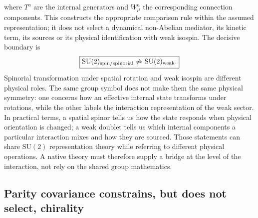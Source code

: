 \documentclass[11pt]{article}
\theoremstyle{definition}
\newcommand{\SUtwo}{\mathrm{SU}(2)}
\begin{document}
where $T^a$ are the internal generators and $W_\mu^a$ the corresponding connection components.  This constructs the appropriate comparison rule within the assumed representation; it does not select a dynamical non-Abelian mediator, its kinetic term, its sources or its physical identification with weak isospin.  The decisive boundary is
\begin{equation}
 \boxed{\SUtwo_{\rm spin/spinorial}\not\Rightarrow\SUtwo_{\rm weak}.}
 \label{eq:spin_su2_not_weak}
\end{equation}
Spinorial transformation under spatial rotation and weak isospin are different physical roles.  The same group symbol does not make them the same physical symmetry: one concerns how an effective internal state transforms under rotations, while the other labels the interaction representation of the weak sector.  In practical terms, a spatial spinor tells us how the state responds when physical orientation is changed; a weak doublet tells us which internal components a particular interaction mixes and how they are sourced.  Those statements can share $\SUtwo$ representation theory while referring to different physical operations.  A native theory must therefore supply a bridge at the level of the interaction, not rely on the shared group mathematics.

\subsection{Parity covariance constrains, but does not select, chirality}
\label{sec:parity_covariance}
\end{document}
